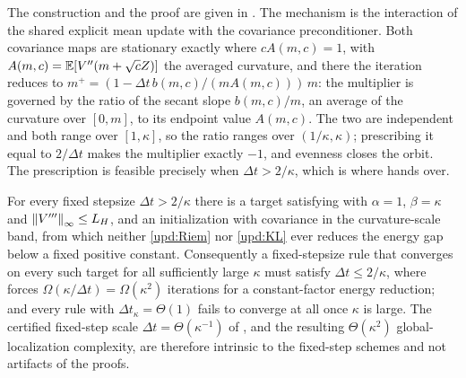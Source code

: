 The construction and the proof are given in . The mechanism is the
interaction of the shared explicit mean update with the covariance preconditioner. Both
covariance maps are stationary exactly where $cA(m,c)=1$, with
$A(m,c)=\mathbb{E}[V''(m+\sqrt cZ)]$ the averaged curvature, and there the iteration reduces to
$m^+=(1-\Delta t\,b(m,c)/(mA(m,c)))\,m$: the multiplier is governed by the ratio of the
secant slope $b(m,c)/m$, an average of the curvature over $[0,m]$, to its endpoint value
$A(m,c)$. The two are independent and both range over $[1,\kappa]$, so the ratio ranges over
$(1/\kappa,\kappa)$; prescribing it equal to $2/\Delta t$ makes the multiplier exactly $-1$,
and evenness closes the orbit. The prescription is feasible precisely when
$\Delta t>2/\kappa$, which is where  hands over.

\begin{corollary}\label{cor:fixed-step}
    For every fixed stepsize $\Delta t>2/\kappa$ there is a target satisfying
     with $\alpha=1$, $\beta=\kappa$ and
    $\left\lVert V'''\right\rVert_\infty\leq L_H$, and an initialization with covariance in the curvature-scale
    band, from which neither \eqref{upd:Riem} nor \eqref{upd:KL} ever reduces the energy gap
    below a fixed positive constant. Consequently a fixed-stepsize rule that converges on
    every such target for all sufficiently large $\kappa$ must satisfy
    $\Delta t\leq2/\kappa$, where  forces
    $\Omega(\kappa/\Delta t)=\Omega(\kappa^2)$ iterations for a constant-factor energy
    reduction; and every rule with $\Delta t_\kappa=\Theta(1)$ fails to converge at all once
    $\kappa$ is large. The certified fixed-step scale $\Delta t=\Theta(\kappa^{-1})$ of
    , and the resulting $\Theta(\kappa^2)$ global-localization
    complexity, are therefore intrinsic to the fixed-step schemes and not artifacts of the
    proofs.
\end{corollary}

